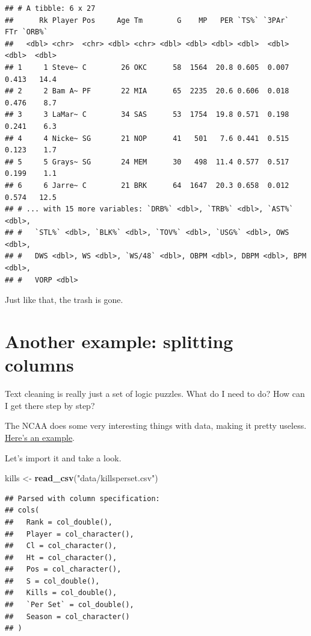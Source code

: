 \documentclass[]{book}
\newenvironment{Shaded}{\begin{snugshade}}{\end{snugshade}}
\newcommand{\KeywordTok}[1]{\textcolor[rgb]{0.13,0.29,0.53}{\textbf{#1}}}
\newcommand{\NormalTok}[1]{#1}
\newcommand{\StringTok}[1]{\textcolor[rgb]{0.31,0.60,0.02}{#1}}
\begin{document}
\begin{verbatim}
## # A tibble: 6 x 27
##      Rk Player Pos     Age Tm        G    MP   PER `TS%` `3PAr`   FTr `ORB%`
##   <dbl> <chr>  <chr> <dbl> <chr> <dbl> <dbl> <dbl> <dbl>  <dbl> <dbl>  <dbl>
## 1     1 Steve~ C        26 OKC      58  1564  20.8 0.605  0.007 0.413   14.4
## 2     2 Bam A~ PF       22 MIA      65  2235  20.6 0.606  0.018 0.476    8.7
## 3     3 LaMar~ C        34 SAS      53  1754  19.8 0.571  0.198 0.241    6.3
## 4     4 Nicke~ SG       21 NOP      41   501   7.6 0.441  0.515 0.123    1.7
## 5     5 Grays~ SG       24 MEM      30   498  11.4 0.577  0.517 0.199    1.1
## 6     6 Jarre~ C        21 BRK      64  1647  20.3 0.658  0.012 0.574   12.5
## # ... with 15 more variables: `DRB%` <dbl>, `TRB%` <dbl>, `AST%` <dbl>,
## #   `STL%` <dbl>, `BLK%` <dbl>, `TOV%` <dbl>, `USG%` <dbl>, OWS <dbl>,
## #   DWS <dbl>, WS <dbl>, `WS/48` <dbl>, OBPM <dbl>, DBPM <dbl>, BPM <dbl>,
## #   VORP <dbl>
\end{verbatim}

Just like that, the trash is gone.

\hypertarget{another-example-splitting-columns}{%
\section{Another example: splitting columns}\label{another-example-splitting-columns}}

Text cleaning is really just a set of logic puzzles. What do I need to do? How can I get there step by step?

The NCAA does some very interesting things with data, making it pretty useless. \href{https://unl.box.com/s/kxjh8k7bm95i8eeovao18nqiky860j1s}{Here's an example}.

Let's import it and take a look.

\begin{Shaded}
\begin{Highlighting}[]
\NormalTok{kills <-}\StringTok{ }\KeywordTok{read_csv}\NormalTok{(}\StringTok{"data/killsperset.csv"}\NormalTok{)}
\end{Highlighting}
\end{Shaded}

\begin{verbatim}
## Parsed with column specification:
## cols(
##   Rank = col_double(),
##   Player = col_character(),
##   Cl = col_character(),
##   Ht = col_character(),
##   Pos = col_character(),
##   S = col_double(),
##   Kills = col_double(),
##   `Per Set` = col_double(),
##   Season = col_character()
## )
\end{verbatim}
\end{document}
